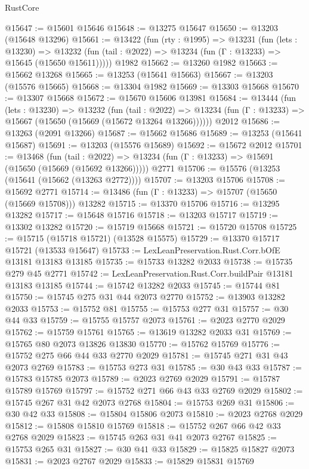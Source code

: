 \begin{lexlean}{RustCore}
\begin{coremodule}
@15647 := @15601 @15646
@15648 := @13275 @15647
@15650 := @13203 (@15648 @13296)
@15661 := @13422
    (fun (rty : @1995) =>
    @13231
      (fun (lets : @13230) =>
      @13232 (fun (tail : @2022) => @13234 (fun (Γ : @13233) => @15645 (@15650 @15611)))))
    @1982
@15662 := @13260 @1982
@15663 := @15662 @13268
@15665 := @13253 (@15641 @15663)
@15667 := @13203 (@15576 @15665)
@15668 := @13304 @1982
@15669 := @13303 @15668
@15670 := @13307 @15668
@15672 := @15670 @15606 @13981
@15684 := @13444
    (fun (lets : @13230) =>
    @13232
      (fun (tail : @2022) =>
      @13234 (fun (Γ : @13233) => @15667 (@15650 (@15669 (@15672 @13264 @13266))))))
    @2012
@15686 := @13263 (@2091 @13266)
@15687 := @15662 @15686
@15689 := @13253 (@15641 @15687)
@15691 := @13203 (@15576 @15689)
@15692 := @15672 @2012
@15701 := @13468
    (fun (tail : @2022) => @13234 (fun (Γ : @13233) => @15691 (@15650 (@15669 (@15692 @13266)))))
    @2771
@15706 := @15576 (@13253 (@15641 (@15662 (@13263 @2772))))
@15707 := @13203 @15706
@15708 := @15692 @2771
@15714 := @13486 (fun (Γ : @13233) => @15707 (@15650 (@15669 @15708))) @13282
@15715 := @13370 @15706
@15716 := @13295 @13282
@15717 := @15648 @15716
@15718 := @13203 @15717
@15719 := @13302 @13282
@15720 := @15719 @15668
@15721 := @15720 @15708
@15725 := @15715 (@15718 @15721) (@13528 @15575)
@15729 := @13370 @15717 @15721 (@13533 @15647)
@15733 := LexLeanPreservation.Rust.Corr.bOfE @13181 @13183 @13185
@15735 := @15733 @13282 @2033
@15738 := @15735 @279 @45 @2771
@15742 := LexLeanPreservation.Rust.Corr.buildPair @13181 @13183 @13185
@15744 := @15742 @13282 @2033
@15745 := @15744 @81
@15750 := @15745 @275 @31 @44 @2073 @2770
@15752 := @13903 @13282 @2033
@15753 := @15752 @81
@15755 := @15753 @277 @31
@15757 := @30 @44 @33
@15759 := @15755 @15757 @2073
@15761 := @2023 @2770 @2029
@15762 := @15759 @15761
@15765 := @13619 @13282 @2033 @31
@15769 := @15765 @80 @2073 @13826 @13830
@15770 := @15762 @15769
@15776 := @15752 @275 @66 @44 @33 @2770 @2029
@15781 := @15745 @271 @31 @43 @2073 @2769
@15783 := @15753 @273 @31
@15785 := @30 @43 @33
@15787 := @15783 @15785 @2073
@15789 := @2023 @2769 @2029
@15791 := @15787 @15789 @15769
@15797 := @15752 @271 @66 @43 @33 @2769 @2029
@15802 := @15745 @267 @31 @42 @2073 @2768
@15804 := @15753 @269 @31
@15806 := @30 @42 @33
@15808 := @15804 @15806 @2073
@15810 := @2023 @2768 @2029
@15812 := @15808 @15810 @15769
@15818 := @15752 @267 @66 @42 @33 @2768 @2029
@15823 := @15745 @263 @31 @41 @2073 @2767
@15825 := @15753 @265 @31
@15827 := @30 @41 @33
@15829 := @15825 @15827 @2073
@15831 := @2023 @2767 @2029
@15833 := @15829 @15831 @15769

\end{coremodule}
\end{lexlean}
